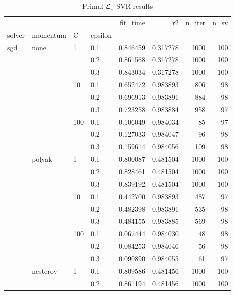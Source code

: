 \begin{table}[H]
\centering
\caption{Primal $\protect \mathcal{L}_1$-SVR results}
\label{primal_l1_svr_cv_results}
\begin{tabular}{llllrrrr}
\toprule
          &   &     &     &  fit\_time &        r2 &  n\_iter &  n\_sv \\
solver & momentum & C & epsilon &           &           &         &       \\
\midrule
sgd & none & 1   & 0.1 &  0.846459 &  0.317278 &    1000 &   100 \\
          &   &     & 0.2 &  0.861568 &  0.317278 &    1000 &   100 \\
          &   &     & 0.3 &  0.843034 &  0.317278 &    1000 &   100 \\
          &   & 10  & 0.1 &  0.652472 &  0.983893 &     806 &    98 \\
          &   &     & 0.2 &  0.696913 &  0.983891 &     884 &    98 \\
          &   &     & 0.3 &  0.723258 &  0.983884 &     958 &    97 \\
          &   & 100 & 0.1 &  0.106049 &  0.984034 &      85 &    97 \\
          &   &     & 0.2 &  0.127033 &  0.984047 &      96 &    98 \\
          &   &     & 0.3 &  0.159614 &  0.984056 &     109 &    98 \\
          & polyak & 1   & 0.1 &  0.800087 &  0.481504 &    1000 &   100 \\
          &   &     & 0.2 &  0.828461 &  0.481504 &    1000 &   100 \\
          &   &     & 0.3 &  0.839192 &  0.481504 &    1000 &   100 \\
          &   & 10  & 0.1 &  0.442700 &  0.983893 &     487 &    97 \\
          &   &     & 0.2 &  0.482398 &  0.983891 &     535 &    98 \\
          &   &     & 0.3 &  0.484155 &  0.983885 &     569 &    98 \\
          &   & 100 & 0.1 &  0.067444 &  0.984030 &      48 &    98 \\
          &   &     & 0.2 &  0.084253 &  0.984046 &      56 &    98 \\
          &   &     & 0.3 &  0.090890 &  0.984055 &      61 &    97 \\
          & nesterov & 1   & 0.1 &  0.809586 &  0.481456 &    1000 &   100 \\
          &   &     & 0.2 &  0.861194 &  0.481456 &    1000 &   100 \\

\end{tabular}
\end{table}
